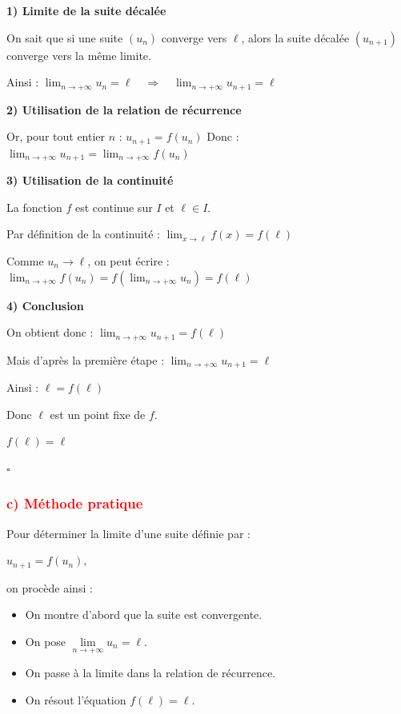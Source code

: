 \documentclass[12pt,a4paper]{article}
\begin{document}
\medskip

\textbf{1) Limite de la suite décalée}

On sait que si une suite $(u_n)$ converge vers $\ell$, alors la suite décalée $(u_{n+1})$ converge vers la même limite.

Ainsi :
\(
\lim_{n\to +\infty} u_n = \ell
\quad \Longrightarrow \quad
\lim_{n\to +\infty} u_{n+1} = \ell
\)

\medskip

\textbf{2) Utilisation de la relation de récurrence}

Or, pour tout entier $n$ :
\(
u_{n+1} = f(u_n)
\)
Donc :
\(
\lim_{n\to +\infty} u_{n+1}
=
\lim_{n\to +\infty} f(u_n)
\)

\medskip

\textbf{3) Utilisation de la continuité}

La fonction $f$ est continue sur $I$ et $\ell \in I$.

Par définition de la continuité :
\(
\lim_{x \to \ell} f(x) = f(\ell)
\)

Comme $u_n \to \ell$, on peut écrire :
\(
\lim_{n\to +\infty} f(u_n)
=
f\!\left(\lim_{n\to +\infty} u_n\right)
=
f(\ell)
\)

\medskip

\textbf{4) Conclusion}

On obtient donc :
\(
\lim_{n\to +\infty} u_{n+1}
=
f(\ell)
\)

Mais d’après la première étape :
\(
\lim_{n\to +\infty} u_{n+1} = \ell
\)

Ainsi :
\(
\ell = f(\ell)
\)

\medskip

Donc $\ell$ est un point fixe de $f$.

\(
\boxed{f(\ell)=\ell}
\)

\hfill $\square$

\vspace{0.3cm}

\subsubsection*{\textcolor{red}{c) Méthode pratique}}

Pour déterminer la limite d’une suite définie par :

\(
u_{n+1} = f(u_n),
\)

on procède ainsi :

\begin{itemize}
\item On montre d’abord que la suite est convergente.
\item On pose $\displaystyle \lim\limits_{n\to +\infty} u_n = \ell$.
\item On passe à la limite dans la relation de récurrence.
\item On résout l’équation $f(\ell) = \ell$.
\end{itemize}
\end{document}
